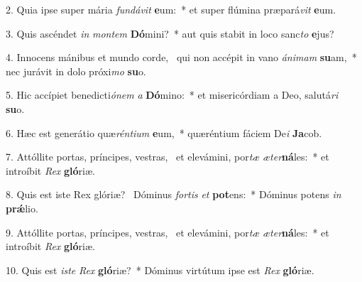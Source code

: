 2. Quia ipse super mária \textit{fun}\textit{dá}\textit{vit} \textbf{e}um:~*  et super flúmina præpará\textit{vit} \textbf{e}um.\

3. Quis ascéndet \textit{in} \textit{mon}\textit{tem} \textbf{Dó}mini?~*  aut quis stabit in loco sanc\textit{to} \textbf{e}jus?\

4. Innocens mánibus et mundo corde, \dag\  qui non accépit in vano \textit{á}\textit{ni}\textit{mam} \textbf{su}am,~*  nec jurávit in dolo próxi\textit{mo} \textbf{su}o.\

5. Hic accípiet benedicti\textit{ó}\textit{nem} \textit{a} \textbf{Dó}mino:~*  et misericórdiam a Deo, salutá\textit{ri} \textbf{su}o.\

6. Hæc est generátio quæ\textit{rén}\textit{ti}\textit{um} \textbf{e}um,~*  quæréntium fáciem De\textit{i} \textbf{Ja}cob.\

7. Attóllite portas, príncipes, vestras, \dag\  et elevámini, por\textit{tæ} \textit{æ}\textit{ter}\textbf{ná}les:~*  et introíbit \textit{Rex} \textbf{gló}riæ.\

8. Quis est iste Rex glóriæ? \dag\  Dóminus \textit{for}\textit{tis} \textit{et} \textbf{pot}ens:~*  Dóminus potens \textit{in} \textbf{prǽ}lio.\

9. Attóllite portas, príncipes, vestras, \dag\  et elevámini, por\textit{tæ} \textit{æ}\textit{ter}\textbf{ná}les:~*  et introíbit \textit{Rex} \textbf{gló}riæ.\

10. Quis est \textit{is}\textit{te} \textit{Rex} \textbf{gló}riæ?~*  Dóminus virtútum ipse est \textit{Rex} \textbf{gló}riæ.\

